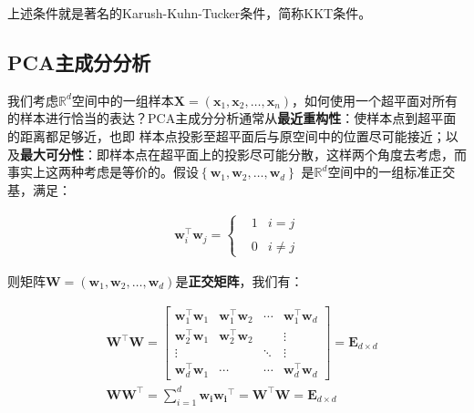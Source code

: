 \documentclass[UTF8]{book}
\begin{document}
上述条件就是著名的Karush-Kuhn-Tucker条件，简称KKT条件。

\subsection{PCA主成分分析}
我们考虑$\mathbb{R}^d$空间中的一组样本$\mathbf{X}=(\mathbf{x}_1,\mathbf{x}_2,\dots,\mathbf{x}_n)$，如何使用一个超平面对所有的样本进行恰当的表达？PCA主成分分析通常从\textbf{最近重构性}：使样本点到超平面的距离都足够近，也即
样本点投影至超平面后与原空间中的位置尽可能接近；以及\textbf{最大可分性}：即样本点在超平面上的投影尽可能分散，这样两个角度去考虑，而事实上这两种考虑是等价的。假设$\left \{ \mathbf{w}_1,\mathbf{w}_2,\dots,\mathbf{w}_d \right \}$
是$\mathbb{R}^d$空间中的一组标准正交基，满足：
\begin{large}
    \begin{equation}
        \begin{aligned}
            \mathbf{w}_i^\top \mathbf{w}_j = 
            \left\{\begin{matrix}
                & 1 & i=j \\
                & & \\
                & 0 & i \not = j 
                \end{matrix}\right.
            \nonumber
        \end{aligned}
    \end{equation}
\end{large}
则矩阵$\mathbf{W}=(\mathbf{w}_1,\mathbf{w}_2,\dots,\mathbf{w}_d)$是\textbf{正交矩阵}，我们有：
\begin{large}
    \begin{equation}
        \begin{aligned}
                &\mathbf{W}^\top\mathbf{W}=\begin{bmatrix}
                \mathbf{w}_1^\top\mathbf{w}_1 & \mathbf{w}_1^\top\mathbf{w}_2 & \cdots  & \mathbf{w}_1^\top\mathbf{w}_d \\
                \mathbf{w}_2^\top\mathbf{w}_1 & \mathbf{w}_2^\top\mathbf{w}_2 &  & \vdots  \\
                \vdots  &  & \ddots  & \vdots  \\
                \mathbf{w}_d^\top\mathbf{w}_1 & \cdots  & \cdots  & \mathbf{w}_d^\top\mathbf{w}_d
                \end{bmatrix}
                =\mathbf{E}_{d\times d} \\
                &\mathbf{W}\mathbf{W}^\top=\sum_{i=1}^{d} \mathbf{w_i}\mathbf{w_i}^\top=\mathbf{W}^\top\mathbf{W}=\mathbf{E}_{d\times d}
            \nonumber
        \end{aligned}
    \end{equation}
\end{large}
\end{document}
